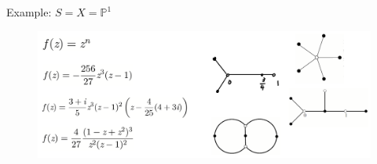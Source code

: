 \documentclass[pdf]{beamer}
\numberwithin{equation}{section}
\theoremstyle{plain}
\theoremstyle{plain}
\theoremstyle{remark}
\begin{document}
\begin{frame}{Example: $S=X=\mathbb{P}^1$}
\begin{figure}[th]
	\begin{minipage}[b]{\textwidth}
		\centering
		\includegraphics[width=1.05\textwidth]{figures/onepage.png}
	\end{minipage}
\end{figure}
\end{frame}
\end{document}
